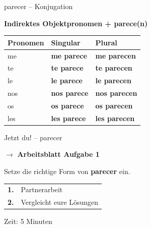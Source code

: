 \documentclass[aspectratio=169, 11pt]{beamer}
\newcommand{\seriftext}[1]{{\fontfamily{ppl}\selectfont #1}}
\newcommand{\es}[1]{\seriftext{\textbf{#1}}}
\newcommand{\abmark}[1]{{\Large$\rightarrow$ \textbf{Arbeitsblatt Aufgabe #1}}}
\begin{document}
\begin{frame}{parecer -- Konjugation}
    \vspace{0.5cm}

    \begin{center}
        {\large\textbf{Indirektes Objektpronomen + parece(n)}}

        \vspace{0.8cm}

        \begin{tabular}{lll}
            \toprule
            \textbf{Pronomen} & \textbf{Singular} & \textbf{Plural} \\
            \midrule
            me & \es{me parece} & \es{me parecen} \\[0.4em]
            te & \es{te parece} & \es{te parecen} \\[0.4em]
            le & \es{le parece} & \es{le parecen} \\[0.4em]
            nos & \es{nos parece} & \es{nos parecen} \\[0.4em]
            os & \es{os parece} & \es{os parecen} \\[0.4em]
            les & \es{les parece} & \es{les parecen} \\
            \bottomrule
        \end{tabular}
    \end{center}
\end{frame}

\begin{frame}{Jetzt du! -- parecer}
    \vspace{1cm}

    \begin{center}
        \abmark{1}

        \vspace{1cm}

        {\large Setze die richtige Form von \es{parecer} ein.}

        \vspace{0.8cm}

        \begin{tabular}{cl}
            \textcolor{akzent}{\textbf{1.}} & Partnerarbeit \\[0.3em]
            \textcolor{akzent}{\textbf{2.}} & Vergleicht eure Lösungen \\
        \end{tabular}

        \vspace{0.8cm}

        {\small Zeit: 5 Minuten}
    \end{center}
\end{frame}
\end{document}
